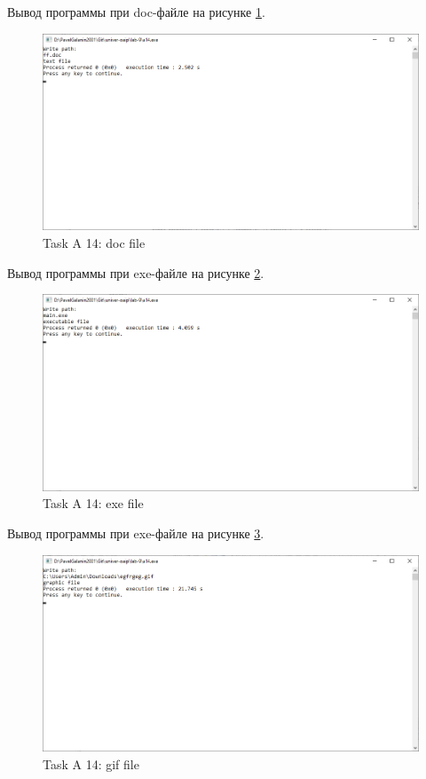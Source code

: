 \documentclass[12pt,a4paper]{article}
\begin{document}
Вывод программы при doc-файле на рисунке \ref{fig:a14-doc}.

\begin{figure}[ht]
  \centering
  \includegraphics[width=12cm]{imgs/a14doc.png}
  \caption{Task A 14: doc file}
  \label{fig:a14-doc}
\end{figure}

Вывод программы при exe-файле на рисунке \ref{fig:a14-exe}.

\begin{figure}[ht]
  \centering
  \includegraphics[width=12cm]{imgs/a14exe.png}
  \caption{Task A 14: exe file}
  \label{fig:a14-exe}
\end{figure}

Вывод программы при exe-файле на рисунке \ref{fig:a14-gif}.

\begin{figure}[ht]
  \centering
  \includegraphics[width=12cm]{imgs/a14gif.png}
  \caption{Task A 14: gif file}
  \label{fig:a14-gif}
\end{figure}
\end{document}

